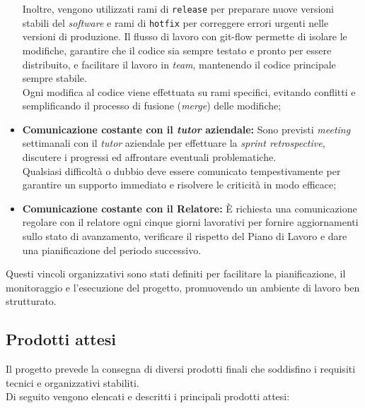 \begin{itemize}
    Inoltre, vengono utilizzati rami di \texttt{release} per preparare nuove versioni stabili del \textit{software} e rami di \texttt{hotfix} per correggere errori urgenti nelle versioni di produzione.
    Il flusso di lavoro con \gls{git-flow} permette di isolare le modifiche, garantire che il codice sia sempre testato e pronto per essere distribuito, e facilitare il lavoro in \textit{team}, mantenendo il codice principale sempre stabile.\\
    Ogni modifica al codice viene effettuata su rami specifici, evitando conflitti e semplificando il processo di fusione (\textit{merge}) delle modifiche;
    \item \textbf{Comunicazione costante con il \textit{tutor} aziendale:} Sono previsti \textit{meeting} settimanali con il \textit{tutor} aziendale per effettuare la \textit{sprint retrospective}, discutere i progressi ed affrontare eventuali problematiche.\\
    Qualsiasi difficoltà o dubbio deve essere comunicato tempestivamente per garantire un supporto immediato e risolvere le criticità in modo efficace;
    \item \textbf{Comunicazione costante con il Relatore:} È richiesta una comunicazione regolare con il relatore ogni cinque giorni lavorativi per fornire aggiornamenti sullo stato di avanzamento, verificare il rispetto del Piano di Lavoro e dare una pianificazione del periodo successivo.\\
\end{itemize}

\noindent Questi vincoli organizzativi sono stati definiti per facilitare la pianificazione, il monitoraggio e l’esecuzione del progetto, promuovendo un ambiente di lavoro ben strutturato.

\subsection{Prodotti attesi}
\label{subsec:prodotti-attesi}

Il progetto prevede la consegna di diversi prodotti finali che soddisfino i requisiti tecnici e organizzativi stabiliti.\\

\noindent Di seguito vengono elencati e descritti i principali prodotti attesi:

